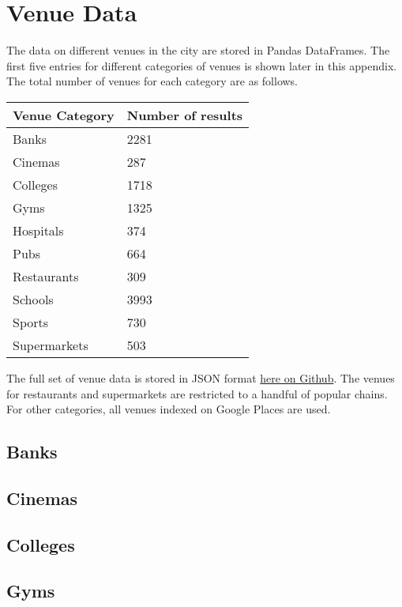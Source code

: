\chapter{Venue Data}\label{app:venueData}

The data on different venues in the city are stored in Pandas DataFrames. The first five entries for different categories of venues is shown later in this appendix. The total number of venues for each category are as follows.

\begin{tabular}{ll}
\toprule
Venue Category & Number of results \\
\midrule
Banks 		& 2281 \\
Cinemas		& 287 \\
Colleges 	& 1718 \\
Gyms 		& 1325 \\
Hospitals 	& 374 \\
Pubs		& 664 \\
Restaurants	& 309 \\
Schools 	& 3993 \\
Sports 		& 730  \\
Supermarkets 	& 503 \\
\bottomrule
\end{tabular}

The full set of venue data is stored in JSON format \href{https://github.com/saba-vadarevu/IBM-dataScience-Capstone/tree/master/final}{here on Github}. The venues for restaurants and supermarkets are restricted to a handful of popular chains. For other categories, all venues indexed on Google Places are used. 

\section{Banks}


\section{Cinemas}


\section{Colleges}


\section{Gyms}


